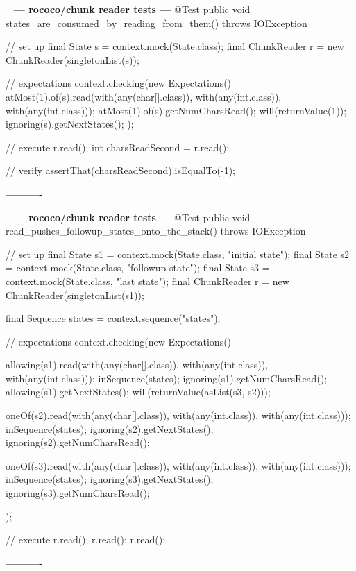 \documentclass{book}
\newenvironment{chunk}[1]{%
{\ }\newline\noindent%
\hbox{\hskip 2.0cm}{\bf --- #1 ---}%
\verbatim}%                               say exactly what we see
{\endverbatim%
\par{}%
\noindent{}%
\hbox{\hskip 2.0cm}{\bf ----------}%
\par%
\normalsize\noindent}%
\begin{document}
\begin{chunk}{rococo/chunk reader tests}
@Test
public void states_are_consumed_by_reading_from_them() throws IOException {
    // set up
    final State s = context.mock(State.class);
    final ChunkReader r = new ChunkReader(singletonList(s));

    // expectations
    context.checking(new Expectations() {{
        atMost(1).of(s).read(with(any(char[].class)), with(any(int.class)), with(any(int.class)));
        atMost(1).of(s).getNumCharsRead();
        will(returnValue(1));
        ignoring(s).getNextStates();
    }});

    // execute
    r.read();
    int charsReadSecond = r.read();

    // verify
    assertThat(charsReadSecond).isEqualTo(-1);
}
\end{chunk}

\begin{chunk}{rococo/chunk reader tests}
@Test
public void read_pushes_followup_states_onto_the_stack() throws IOException {
    // set up
    final State s1 = context.mock(State.class, "initial state");
    final State s2 = context.mock(State.class, "followup state");
    final State s3 = context.mock(State.class, "last state");
    final ChunkReader r = new ChunkReader(singletonList(s1));

    final Sequence states = context.sequence("states");

    // expectations
    context.checking(new Expectations() {{
        allowing(s1).read(with(any(char[].class)), with(any(int.class)), with(any(int.class)));
        inSequence(states);
        ignoring(s1).getNumCharsRead();
        allowing(s1).getNextStates();
        will(returnValue(asList(s3, s2)));

        oneOf(s2).read(with(any(char[].class)), with(any(int.class)), with(any(int.class)));
        inSequence(states);
        ignoring(s2).getNextStates();
        ignoring(s2).getNumCharsRead();

        oneOf(s3).read(with(any(char[].class)), with(any(int.class)), with(any(int.class)));
        inSequence(states);
        ignoring(s3).getNextStates();
        ignoring(s3).getNumCharsRead();
    }});

    // execute
    r.read();
    r.read();
    r.read();
}
\end{chunk}
\end{document}
